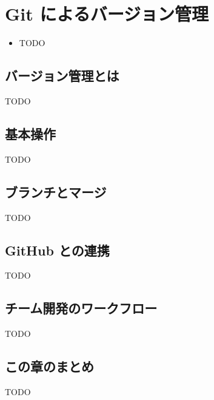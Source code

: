 \chapter{Git によるバージョン管理}
\label{chap:git}

\begin{goalbox}
  \begin{itemize}
    \item TODO
  \end{itemize}
\end{goalbox}

\section{バージョン管理とは}

TODO

\section{基本操作}

TODO

\section{ブランチとマージ}

TODO

\section{GitHub との連携}

TODO

\section{チーム開発のワークフロー}

TODO

\section*{この章のまとめ}

TODO
